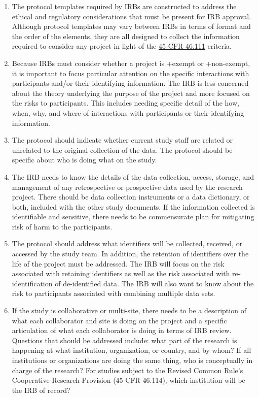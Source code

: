 \documentclass[
]{WileySix}
\begin{document}
\begin{enumerate}
\def\labelenumi{\arabic{enumi}.}
\item
  The protocol templates required by IRBs are constructed to address the ethical and regulatory considerations that must be present for IRB approval. Although protocol templates may vary between IRBs in terms of format and the order of the elements, they are all designed to collect the information required to consider any project in light of the \href{https://www.law.cornell.edu/cfr/text/45/46.111}{45 CFR 46.111} criteria.
\item
  Because IRBs must consider whether a project is +exempt\textbar{} or +non-exempt\textbar, it is important to focus particular attention on the specific interactions with participants and/or their identifying information. The IRB is less concerned about the theory underlying the purpose of the project and more focused on the risks to participants. This includes needing specific detail of the how, when, why, and where of interactions with participants or their identifying information.
\item
  The protocol should indicate whether current study staff are related or unrelated to the original collection of the data. The protocol should be specific about who is doing what on the study.
\item
  The IRB needs to know the details of the data collection, access, storage, and management of any retrospective or prospective data used by the research project. There should be data collection instruments or a data dictionary, or both, included with the other study documents. If the information collected is identifiable and sensitive, there needs to be commensurate plan for mitigating risk of harm to the participants.
\item
  The protocol should address what identifiers will be collected, received, or accessed by the study team. In addition, the retention of identifiers over the life of the project must be addressed. The IRB will focus on the risk associated with retaining identifiers as well as the risk associated with re-identification of de-identified data. The IRB will also want to know about the risk to participants associated with combining multiple data sets.
\item
  If the study is collaborative or multi-site, there needs to be a description of what each collaborator and site is doing on the project and a specific articulation of what each collaborator is doing in terms of IRB review. Questions that should be addressed include: what part of the research is happening at what institution, organization, or country, and by whom? If all institutions or organizations are doing the same thing, who is conceptually in charge of the research? For studies subject to the Revised Common Rule's Cooperative Research Provision (45 CFR 46.114), which institution will be the IRB of record?

\end{enumerate}
\end{document}
